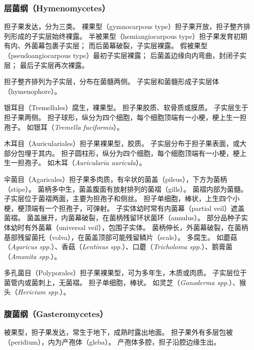 \documentclass[11pt]{article}
\begin{document}
\subsubsection{层菌纲（Hymenomycetes）}
担子果发达，分为三类。
裸果型（gymnocarpous type）担子果开放，担子整齐排列形成的子实层始终裸露。
半被果型（hemiangiocarpous type）担子果发育初期有内、外菌幕包裹子实层；
而后菌幕破裂，子实层裸露。
假被果型（pseudoangiocarpous type）最初子实层裸露；
后菌盖边缘向内弯曲，封闭子实层；
最后子实层再次裸露。

\newline

担子整齐排列为子实层，分布在菌髓两侧。
子实层和菌髓形成子实层体（hymenophore）。

\newline

银耳目（Tremellales）腐生，裸果型。
担子果胶质、软骨质或膜质。
子实层生于担子果两侧。
担子球形，纵分为四个细胞，每个细胞顶端有一小梗，梗上生一担孢子。
如银耳（\textit{Tremella fuciformis}）。

\newline

木耳目（Auriculariales）担子果裸果型，胶质。
子实层分布于担子果表面，或大部分包埋于其内。
担子圆柱形，纵分为四个细胞，每个细胞顶端有一小梗，梗上生一担孢子。
如木耳（\textit{Auricularia auricula}）。

\newline

伞菌目（Agaricales）担子果多肉质，有伞状的菌盖（pileus），下方为菌柄（stipe）。
菌柄多中生，菌盖腹面有放射排列的菌褶（gills）。
菌褶内部为菌髓。
子实层位于菌褶两面，主要为担孢子和侧丝。
担子单细胞，棒状，上生四个小梗，梗顶端有一个担孢子，可弹射。
子实体幼时常有内菌幕（partial veil）遮盖菌褶。
菌盖展开，内菌幕破裂，在菌柄残留环状菌环（annulus）。
部分品种子实体幼时有外菌幕（universal veil），包围子实体。
菌柄伸长，外菌幕破裂，在菌柄基部残留菌托（volva），在菌盖顶部可能残留鳞片（scale）。
多腐生。
如蘑菇（\textit{Agaricus spp.}）、香菇（\textit{Lentinus spp.}）、口蘑（\textit{Tricholoma spp.}）、鹅膏菌（\textit{Amanita spp.}）。

\newline

多孔菌目（Polyporales）担子果裸果型，可为多年生，木质或肉质。
子实层位于菌管内或菌刺上，无菌褶。
担子单细胞，棒状。
如灵芝（\textit{Ganoderma spp.}）、猴头（\textit{Hericium spp.}）。

\subsubsection{腹菌纲（Gasteromycetes）}
被果型，担子果发达，常生于地下，成熟时露出地面。
担子果外有多层包被（peridium），内为产孢体（gleba）。
产孢体多腔，担子沿腔边缘生出。
\end{document}
